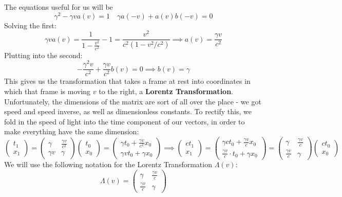\documentclass[12pt]{scrartcl}
\begin{document}
The equations useful for us will be
\[
	\gamma^2 - \gamma v a(v) = 1 \quad \gamma a(-v) + a(v) b(-v) = 0
\]
Solving the first:
\[
	\gamma v a(v) = \frac{1}{1 - \frac{v^2}{c^2}} - 1 = \frac{v^2}{c^2(1 - v^2/c^2)} \implies a(v) = \frac{\gamma v}{c^2}
\]
Plutting into the second:
\[
	-\frac{\gamma^2 v}{c^2} + \frac{\gamma v}{c^2} b(v) = 0 \implies b(v) = \gamma
\]
This gives us the transformation that takes a frame at rest into coordinates in which that frame is moving $v$ to the right, a \textbf{Lorentz Transformation}.
Unfortunately, the dimensions of the matrix are sort of all over the place - we got speed and speed inverse, as well as dimensionless constants. To rectify this, we fold in the speed of light into the time component of our vectors, in order to make everything have the same dimension:
\[
	\begin{pmatrix}
		t_1 \\ x_1
	\end{pmatrix} = \begin{pmatrix}
		\gamma & \frac{\gamma v}{c^2} \\ \gamma v & \gamma
	\end{pmatrix}\begin{pmatrix}
		t_0 \\ x_0
	\end{pmatrix} = \begin{pmatrix}
		\gamma t_0 + \frac{\gamma v}{c^2}x_0 \\ \gamma v t_0 + \gamma x_0
	\end{pmatrix} \implies \begin{pmatrix}
		ct_1 \\ x_1
	\end{pmatrix} = \begin{pmatrix}
		\gamma c t_0 + \frac{\gamma v}{c}x_0 \\ \frac{\gamma v}{c} \cdot t_0 + \gamma x_0 \end{pmatrix}= \begin{pmatrix}
		\gamma & \frac{\gamma v}{c} \\ \frac{\gamma v}{c} & \gamma
	\end{pmatrix}\begin{pmatrix}
		ct_0 \\ x_0
	\end{pmatrix}
\]
We will use the following notation for the Lorentz Transformation $\Lambda (v)$:
\[
	\Lambda (v) = \begin{pmatrix}
		\gamma & \frac{\gamma v}{c} \\ \frac{\gamma v}{c} & \gamma
	\end{pmatrix}
\]
\end{document}
